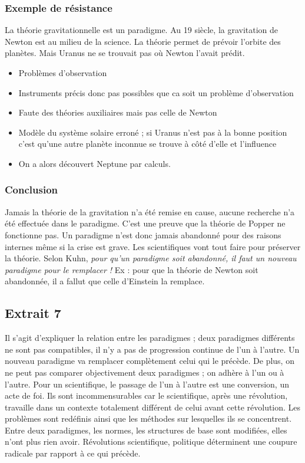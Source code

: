 \subsubsection{Exemple de résistance}
La théorie gravitationnelle est un paradigme.
Au 19\ieme{} siècle, la gravitation de Newton est au milieu de la science.
La théorie permet de prévoir l'orbite des planètes.
Mais Uranus ne se trouvait pas où Newton l'avait prédit.
\begin{itemize}
	\item Problèmes d'observation
	\item Instruments précis donc pas possibles que ca soit un problème d'observation
	\item Faute des théories auxiliaires mais pas celle de Newton
	\item Modèle du système solaire erroné ; si Uranus n'est pas à la bonne position c'est qu'une autre planète inconnue se trouve à côté d'elle et l'influence
	\item On a alors découvert Neptune par calculs.
\end{itemize}
\subsubsection{Conclusion}
Jamais la théorie de la gravitation n'a été remise en cause, aucune recherche n'a été effectuée dans le paradigme.
C'est une preuve que la théorie de Popper ne fonctionne pas.
Un paradigme n'est donc jamais abandonné pour des raisons internes même si la crise est grave.
Les scientifiques vont tout faire pour préserver la théorie.
Selon Kuhn, \emph{pour qu'un paradigme soit abandonné, il faut un nouveau paradigme pour le remplacer !} Ex : pour que la théorie de Newton soit abandonnée, il a fallut que celle d'Einstein la remplace.
\subsection{Extrait 7}Il s'agit d'expliquer la relation entre les paradigmes ; deux paradigmes différents ne sont pas compatibles, il n'y a pas de progression continue de l'un à l'autre.
Un nouveau paradigme va remplacer complètement celui qui le précède.
De plus, on ne peut pas comparer objectivement deux paradigmes ; on adhère à l'un ou à l'autre.
Pour un scientifique, le passage de l'un à l'autre est une conversion, un acte de foi.
Ils sont incommensurables car le scientifique, après une révolution, travaille dans un contexte totalement différent de celui avant cette révolution.
Les problèmes sont redéfinis ainsi que les méthodes sur lesquelles ils se concentrent.
Entre deux paradigmes, les normes, les structures de base sont modifiées, elles n'ont plus rien avoir.
Révolutions scientifique, politique déterminent une coupure radicale par rapport à ce qui précède.
